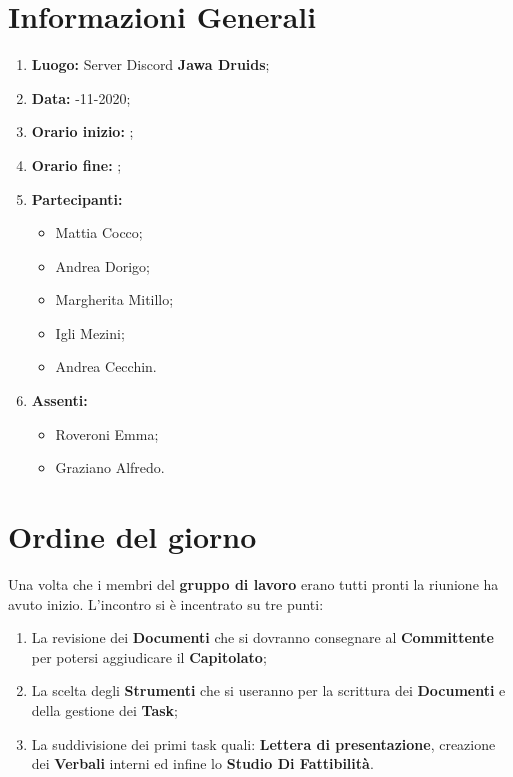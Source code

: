 \newpage
	\section{Informazioni Generali}
	\begin{enumerate}
		\item \textbf{Luogo:} \normalfont Server Discord \textbf{Jawa Druids};
		\item \textbf{Data:} -11-2020;
		\item \textbf{Orario inizio:} ;
		\item \textbf{Orario fine:} ;
		\item \textbf{Partecipanti:}
		\begin{itemize}
			\item Mattia Cocco; 
			\item Andrea Dorigo;
			\item Margherita Mitillo;
			\item Igli Mezini;
			\item Andrea Cecchin.
		\end{itemize}
		\item \textbf{Assenti:}
		\begin{itemize}
			\item Roveroni Emma;
			\item Graziano Alfredo.
		\end{itemize}
	\end{enumerate}
	\section{Ordine del giorno}
	Una volta che i membri del \textbf{gruppo di lavoro} erano tutti pronti la riunione ha avuto inizio.
	L'incontro si è incentrato su tre punti:
	\begin{enumerate}
		\item La revisione dei \textbf{Documenti} che si dovranno consegnare al \textbf{Committente} per potersi aggiudicare il \textbf{Capitolato};
		
		\item La scelta degli \textbf{Strumenti} che si useranno per la scrittura dei \textbf{Documenti} e della gestione dei \textbf{Task};
		
		\item La suddivisione dei primi task quali: \textbf{Lettera di presentazione}, creazione dei \textbf{Verbali} interni ed infine lo \textbf{Studio Di Fattibilità}.
	\end{enumerate}

